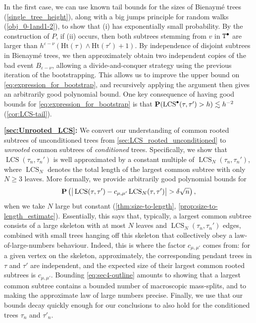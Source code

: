 \documentclass[11pt,reqno]{amsart}
\newcommand{\Ht}{\mathrm{Ht}}
\newcommand{\LCS}{\operatorname{LCS}}
\begin{document}
In the first case, we can use known tail bounds for the sizes of Bienaym\'{e} trees (\cref{single_tree_height}), along with a big jumps principle for random walks (\cref{obj_0-1and1-2}), to show that (i) has exponentially small probability. By the construction of $P$, if (ii) occurs, then both subtrees stemming from $v$ in $\mathtt{T}^\bullet$ are larger than $h^{\varepsilon-\nu}(\Ht(\tau) \wedge \Ht(\tau')+1)$. By independence of disjoint subtrees in Bienaym\'{e} trees, we then approximately obtain two independent copies of the bad event $B_{\varepsilon-\nu}$, allowing a divide-and-conquer strategy using the previous iteration of the bootstrapping. This allows us to improve the upper bound on \eqref{eq:expression_for_bootstrap}, and recursively applying the argument then gives an arbitrarily good polynomial bound. One key consequence of having good bounds for \eqref{eq:expression_for_bootstrap} is that $\prob(\LCS^\bullet(\tau,\tau') > h) \lesssim h^{-2}$ (\cref{cor:LCS-tail}).
\medskip

{\bf \cref{sec:Unrooted_LCS}:} We convert our understanding of common rooted subtrees of unconditioned trees from \cref{sec:LCS_rooted_unconditioned} to \emph{unrooted} common subtrees of \emph{conditioned} trees. Specifically, we show that $\LCS(\tau_n,\tau_n')$ is well approximated by a constant multiple of $\LCS_N(\tau_n,\tau_n')$, where $\LCS_N$ denotes the total length of the largest common subtree with only $N\geq 3$ leaves. More formally, we provide arbitrarily good polynomial bounds for 
\begin{equation}\label{eq:sec4-outline}
\prob\left( \big|\LCS(\tau,\tau') - c_{\mu,\mu'}\LCS_N(\tau,\tau')\big| > \delta \sqrt{n} \right),
\end{equation}
when we take $N$ large but constant (\cref{thm:size-to-length}, \cref{prop:size-to-length_estimate}). Essentially, this says that, typically, a largest common subtree consists of a large skeleton with at most $N$ leaves and $\LCS_N(\tau_n,\tau_n')$ edges, combined with small trees hanging off this skeleton that collectively obey a law-of-large-numbers behaviour. Indeed, this is where the factor $c_{\mu,\mu'}$ comes from: for a given vertex on the skeleton, approximately, the corresponding pendant trees in $\tau$ and $\tau'$ are independent, and the expected size of their largest common rooted subtrees is $c_{\mu,\mu'}$. Bounding \eqref{eq:sec4-outline} amounts to showing that a largest common subtree contains a bounded number of macroscopic mass-splits, and to making the approximate law of large numbers precise. Finally, we use that our bounds decay quickly enough for our conclusions to also hold for the conditioned trees $\tau_n$ and $\tau'_n$.
\medskip
\end{document}
